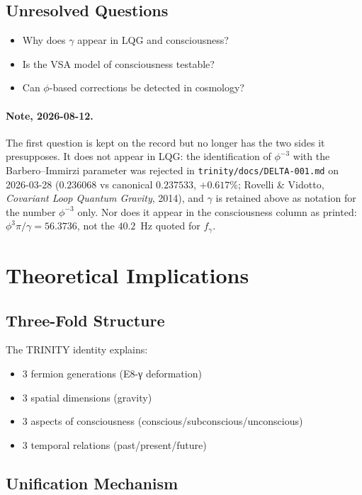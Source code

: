 \documentclass[12pt,a4paper]{article}
\begin{document}
\subsection{Unresolved Questions}

\begin{itemize}
\item Why does $\gamma$ appear in LQG and consciousness?
\item Is the VSA model of consciousness testable?
\item Can $\phi$-based corrections be detected in cosmology?
\end{itemize}

\paragraph{Note, 2026-08-12.} The first question is kept on the record but no longer has the two sides it presupposes. It does not appear in LQG: the identification of $\phi^{-3}$ with the Barbero--Immirzi parameter was rejected in \texttt{trinity/docs/DELTA-001.md} on 2026-03-28 ($0.236068$ vs canonical $0.237533$, $+0.617\%$; Rovelli \& Vidotto, \emph{Covariant Loop Quantum Gravity}, 2014), and $\gamma$ is retained above as notation for the number $\phi^{-3}$ only. Nor does it appear in the consciousness column as printed: $\phi^3\pi/\gamma = 56.3736$, not the $40.2$~Hz quoted for $f_\gamma$.

\section{Theoretical Implications}

\subsection{Three-Fold Structure}

The TRINITY identity explains:
\begin{itemize}
\item 3 fermion generations (E8-γ deformation)
\item 3 spatial dimensions (gravity)
\item 3 aspects of consciousness (conscious/subconscious/unconscious)
\item 3 temporal relations (past/present/future)
\end{itemize}

\subsection{Unification Mechanism}
\end{document}
